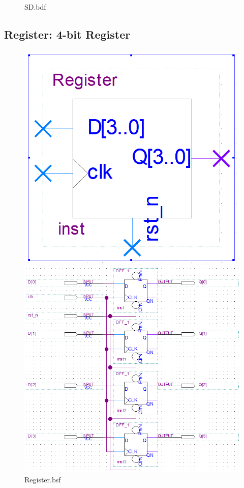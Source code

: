 \documentclass[12pt,a4paper]{article}
\begin{document}
\begin{figure}[H]
\begin{subcaptionblock}{0.84\linewidth}
      \caption{SD.bdf}
    \end{subcaptionblock}
  \end{figure}

  \subsection{Register: 4-bit Register}
  \begin{figure}[H]
    \centering
    \begin{subcaptionblock}{0.19\linewidth}
      \includegraphics[width=\linewidth]{Lab2_2/Register_bsf.png}
      \caption{Register.bsf}
    \end{subcaptionblock}
    \begin{subcaptionblock}{0.8\linewidth}
      \includegraphics[width=\linewidth]{Lab2_2/Register_bdf.png}

\end{subcaptionblock}
\end{figure}
\end{document}
